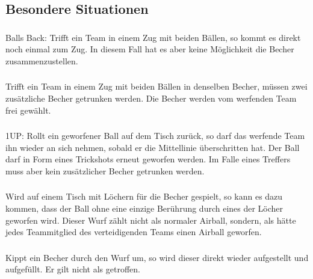 \subsection{Besondere Situationen}
\subsubsection{}
\glqq{} Balls Back\grqq{}: Trifft ein Team in einem Zug mit beiden Bällen, so kommt es direkt noch einmal zum Zug.
In diesem Fall hat es aber keine Möglichkeit die Becher zusammenzustellen.

\subsubsection{}
Trifft ein Team in einem Zug mit beiden Bällen in denselben Becher, müssen zwei zusätzliche Becher getrunken werden.
Die Becher werden vom werfenden Team frei gewählt.

\subsubsection{}
\glqq{} 1UP\grqq{}: Rollt ein geworfener Ball auf dem Tisch zurück, so darf das werfende Team ihn wieder an sich nehmen, sobald er die Mittellinie überschritten hat.
Der Ball darf in Form eines Trickshots erneut geworfen werden.
Im Falle eines Treffers muss aber kein zusätzlicher Becher getrunken werden.

\subsubsection{}
Wird auf einem Tisch mit Löchern für die Becher gespielt, so kann es dazu kommen, dass der Ball ohne eine einzige Berührung durch eines der Löcher geworfen wird.
Dieser Wurf zählt nicht als normaler Airball, sondern, als hätte jedes Teammitglied des verteidigenden Teams einen Airball geworfen.

\subsubsection{}
Kippt ein Becher durch den Wurf um, so wird dieser direkt wieder aufgestellt und aufgefüllt.
Er gilt nicht als getroffen.
